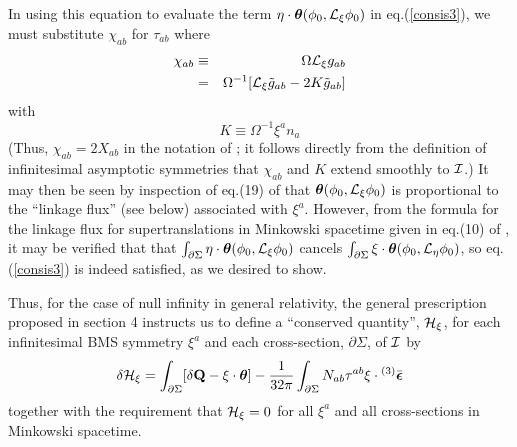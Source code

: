 In using this equation to evaluate the term $\eta \cdot
{\mbox{\boldmath $\theta$}}(\phi_0,{\cal L}_\xi \phi_0)$ in
eq.(\ref{consis3}), we must substitute $\chi_{ab}$ for $\tau_{ab}$
where
\begin{eqnarray}
\chi_{ab} & \equiv & \Omega {\cal L}_\xi g_{ab} \nonumber \\
& = & \Omega^{-1} [{\cal L}_\xi \tilde{g}_{ab} - 2K \tilde{g}_{ab}]
\label{chi}
\end{eqnarray}
with
\begin{equation}
K \equiv \Omega^{-1} \xi^a n_a
\label{K}
\end{equation}
(Thus, $\chi_{ab} = 2X_{ab}$ in the notation of \cite{gw}; it follows
directly from the definition of infinitesimal asymptotic symmetries
that $\chi_{ab}$ and $K$ extend smoothly to $\cal I$.) It may then be
seen by inspection of eq.(19) of \cite{gw} that ${\mbox{\boldmath
$\theta$}}(\phi_0,{\cal L}_\xi \phi_0)$ is proportional to the
``linkage flux'' (see below) associated with $\xi^a$. However, from
the formula for the linkage flux for supertranslations in Minkowski
spacetime given in eq.(10) of \cite{aw}, it may be verified that that
$\int_{\partial \Sigma} \eta \cdot {\mbox{\boldmath
$\theta$}}(\phi_0,{\cal L}_\xi \phi_0)$ cancels $\int_{\partial
\Sigma} \xi \cdot {\mbox{\boldmath $\theta$}}(\phi_0,{\cal L}_\eta
\phi_0)$, so eq.(\ref{consis3}) is indeed satisfied, as we desired to
show.

Thus, for the case of null infinity in general relativity, the general
prescription proposed in section 4 instructs us to define a
``conserved quantity'', ${\cal H}_\xi$, for each infinitesimal BMS
symmetry $\xi^a$ and each cross-section, $\partial \Sigma$, of $\cal I$
by
\begin{equation}
\delta {\cal H}_\xi = \int_{\partial \Sigma} [\delta {\bf Q} - \xi
\cdot {\mbox{\boldmath $\theta$}}] - \frac{1}{32 \pi} \int_{\partial
\Sigma} N_{ab} \tau^{ab} \xi \cdot {}^{(3)} \bar{\mbox{\boldmath
$\epsilon$}}
\label{dhfinal}
\end{equation}
together with the requirement that ${\cal H}_\xi = 0$ for all $\xi^a$
and all cross-sections in Minkowski spacetime. 

